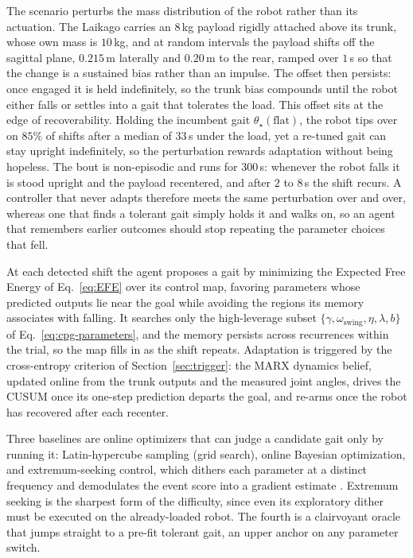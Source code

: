 \documentclass[lettersize,journal]{IEEEtran}
\begin{document}
The scenario perturbs the mass distribution of the robot rather than its actuation.
The Laikago carries an $8$\,kg payload rigidly attached above its trunk, whose own mass is $10$\,kg, and at random intervals the payload shifts off the sagittal plane, $0.215$\,m laterally and $0.20$\,m to the rear, ramped over $1$\,s so that the change is a sustained bias rather than an impulse.
The offset then persists: once engaged it is held indefinitely, so the trunk bias compounds until the robot either falls or settles into a gait that tolerates the load.
This offset sits at the edge of recoverability.
Holding the incumbent gait $\theta_{\star}(\text{flat})$, the robot tips over on $85\%$ of shifts after a median of $33$\,s under the load, yet a re-tuned gait can stay upright indefinitely, so the perturbation rewards adaptation without being hopeless.
The bout is non-episodic and runs for $300$\,s: whenever the robot falls it is stood upright and the payload recentered, and after $2$ to $8$\,s the shift recurs.
A controller that never adapts therefore meets the same perturbation over and over, whereas one that finds a tolerant gait simply holds it and walks on, so an agent that remembers earlier outcomes should stop repeating the parameter choices that fell.

At each detected shift the agent proposes a gait by minimizing the Expected Free Energy of Eq.~\ref{eq:EFE} over its control map, favoring parameters whose predicted outputs lie near the goal while avoiding the regions its memory associates with falling.
It searches only the high-leverage subset $\{\gamma, \omega_{\text{swing}}, \eta, \lambda, b\}$ of Eq.~\ref{eq:cpg-parameters}, and the memory persists across recurrences within the trial, so the map fills in as the shift repeats.
Adaptation is triggered by the cross-entropy criterion of Section~\ref{sec:trigger}: the MARX dynamics belief, updated online from the trunk outputs and the measured joint angles, drives the CUSUM once its one-step prediction departs the goal, and re-arms once the robot has recovered after each recenter.

Three baselines are online optimizers that can judge a candidate gait only by running it: Latin-hypercube sampling (grid search), online Bayesian optimization, and extremum-seeking control, which dithers each parameter at a distinct frequency and demodulates the event score into a gradient estimate \cite{killingsworth2006extremum}.
Extremum seeking is the sharpest form of the difficulty, since even its exploratory dither must be executed on the already-loaded robot.
The fourth is a clairvoyant oracle that jumps straight to a pre-fit tolerant gait, an upper anchor on any parameter switch.
\end{document}
